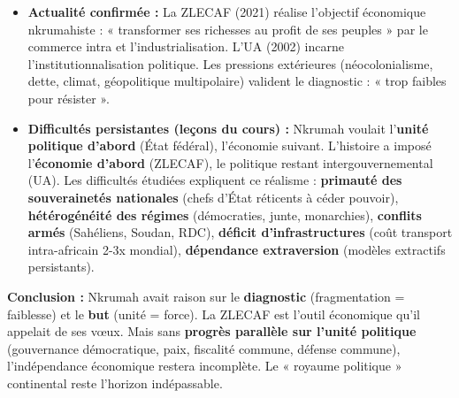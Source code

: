\documentclass[11pt]{article}
\begin{document}
\begin{corrige}
\begin{enumerate}
\begin{itemize}
\item \textbf{Actualité confirmée :} La ZLECAF (2021) réalise l'objectif économique nkrumahiste : « transformer ses richesses au profit de ses peuples » par le commerce intra et l'industrialisation. L'UA (2002) incarne l'institutionnalisation politique. Les pressions extérieures (néocolonialisme, dette, climat, géopolitique multipolaire) valident le diagnostic : « trop faibles pour résister ».
\item \textbf{Difficultés persistantes (leçons du cours) :} Nkrumah voulait l'\textbf{unité politique d'abord} (État fédéral), l'économie suivant. L'histoire a imposé l'\textbf{économie d'abord} (ZLECAF), le politique restant intergouvernemental (UA). Les difficultés étudiées expliquent ce réalisme : \textbf{primauté des souverainetés nationales} (chefs d'État réticents à céder pouvoir), \textbf{hétérogénéité des régimes} (démocraties, junte, monarchies), \textbf{conflits armés} (Sahéliens, Soudan, RDC), \textbf{déficit d'infrastructures} (coût transport intra-africain 2-3x mondial), \textbf{dépendance extraversion} (modèles extractifs persistants).
\end{itemize}
\textbf{Conclusion :} Nkrumah avait raison sur le \textbf{diagnostic} (fragmentation = faiblesse) et le \textbf{but} (unité = force). La ZLECAF est l'outil économique qu'il appelait de ses vœux. Mais sans \textbf{progrès parallèle sur l'unité politique} (gouvernance démocratique, paix, fiscalité commune, défense commune), l'indépendance économique restera incomplète. Le « royaume politique » continental reste l'horizon indépassable.
\end{enumerate}
\end{corrige}
\end{document}

